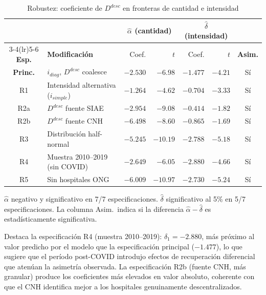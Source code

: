 \documentclass[12pt, a4paper]{article}
\begin{document}
\begin{table}[htbp]
\centering
\caption{Robustez: coeficiente de $D^{desc}$ en fronteras de cantidad e
intensidad}
\label{tab:robustez}
\begin{threeparttable}
\small
\begin{tabular}{clrrrrc}
\toprule
& & \multicolumn{2}{c}{$\hat{\alpha}$ (cantidad)}
  & \multicolumn{2}{c}{$\hat{\delta}$ (intensidad)}
  & \\
\cmidrule(lr){3-4}\cmidrule(lr){5-6}
\textbf{Esp.} & \textbf{Modificación} & Coef. & $t$
  & Coef. & $t$ & \textbf{Asim.} \\
\midrule
\textbf{Princ.} & $i_{diag}$, $D^{desc}$ coalesce
  & $-2.530$ & $-6.98$ & $-1.477$ & $-4.21$ & Sí \\
R1 & Intensidad alternativa ($i_{simple}$)
  & $-1.264$ & $-4.62$ & $-0.704$ & $-3.33$ & Sí \\
R2a & $D^{desc}$ fuente SIAE
  & $-2.954$ & $-9.08$ & $-0.414$ & $-1.82$ & Sí \\
R2b & $D^{desc}$ fuente CNH
  & $-6.498$ & $-8.60$ & $-0.865$ & $-1.69$ & Sí \\
R3 & Distribución half-normal
  & $-5.245$ & $-10.19$ & $-2.788$ & $-5.18$ & Sí \\
R4 & Muestra 2010--2019 (sin COVID)
  & $-2.649$ & $-6.05$ & $-2.880$ & $-4.66$ & Sí \\
R5 & Sin hospitales ONG
  & $-6.009$ & $-10.97$ & $-2.730$ & $-5.24$ & Sí \\
\bottomrule
\end{tabular}
\begin{tablenotes}
  \small
  \item $\hat{\alpha}$ negativo y significativo en 7/7 especificaciones.
    $\hat{\delta}$ significativo al 5\% en 5/7 especificaciones. La columna
    Asim.\ indica si la diferencia $\hat{\alpha}-\hat{\delta}$ es
    estadísticamente significativa.
\end{tablenotes}
\end{threeparttable}
\end{table}

Destaca la especificación R4 (muestra 2010--2019): $\hat{\delta}_1 = -2.880$,
más próximo al valor predicho por el modelo que la especificación principal
($-1.477$), lo que sugiere que el período post-COVID introdujo efectos de
recuperación diferencial que atenúan la asimetría observada. La especificación
R2b (fuente CNH, más granular) produce los coeficientes más elevados en valor
absoluto, coherente con que el CNH identifica mejor a los hospitales
genuinamente descentralizados.
\end{document}

